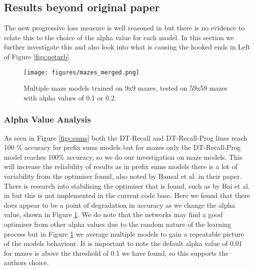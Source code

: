\subsection{Results beyond original paper}
\label{subsec:newresults}
The new progressive loss measure is well reasoned in \cite{bansal2022endtoend} but there is no evidence to relate this to the choice of the alpha value for each model. In this section we further investigate this and also look into what is causing the hooked ends in Left of Figure \ref{figs:peturb}.

\begin{figure}[h]
\centering
    \texttt{[image: figures/mazes\_merged.png]}\hfill
    \\[\smallskipamount]
    \caption{
    Multiple maze models trained on 9x9 mazes, tested on 59x59 mazes with alpha values of 0.1 or 0.2.}
    \label{figs:alpha}
\end{figure}
 
\subsubsection{Alpha Value Analysis}
As seen in Figure \ref{figs:sums} both the DT-Recall and DT-Recall-Prog lines reach 100 \% accuracy for prefix sums models but for mazes only the DT-Recall-Prog model reaches 100\% accuracy, so we do our investigation on maze models. This will increase the reliability of results as in prefix sums models there is a lot of variability from the optimiser found, also noted by Bansal et al. in their paper. There is research into stabilising the optimiser that is found, such as by Bai et al. in \cite{bai2021jacobian} but this is not implemented in the current code base.
Here we found that there does appear to be a point of degradation in accuracy as we change the alpha value, shown in Figure \ref{figs:alpha}. We do note that the networks may find a good optimiser from other alpha values due to the random nature of the learning process
but in Figure \ref{figs:alpha} we average multiple models to gain a repeatable picture of the models behaviour. It is important to note the default alpha value of 0.01 for mazes is above the threshold of 0.1 we have found, so this supports the authors choice.

